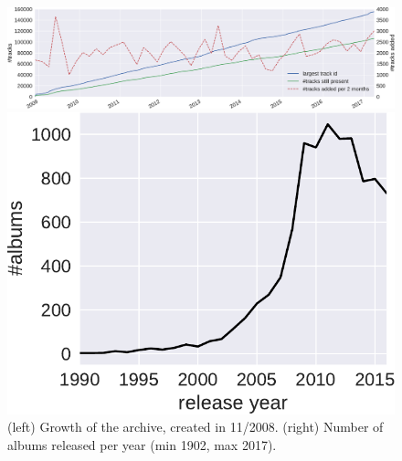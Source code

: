 \documentclass{article}
\begin{document}
\begin{figure}
	\begin{minipage}{0.74\linewidth}
		\centering
		\includegraphics[width=\linewidth]{growth.pdf}
	\end{minipage} \hfill
	\begin{minipage}{0.24\linewidth}
		\centering
		\includegraphics[width=\linewidth]{album_release_year.pdf}
	\end{minipage}
	\caption{(left) Growth of the archive, created in 11/2008. (right) Number of albums released per year (min 1902, max 2017).}
	\label{fig:growth}
	\label{fig:album_release_year}
\end{figure}
\end{document}
